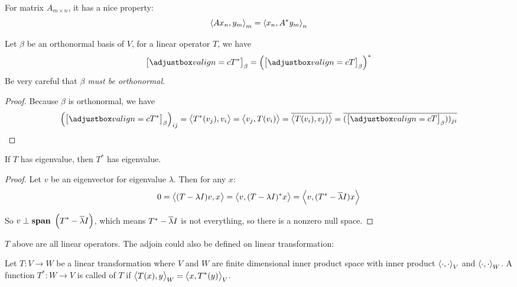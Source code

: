 For matrix $A_{m \times n}$, it has a nice property:
\begin{equation}
    \left\langle \displaystyle A x_n, y_m \right\rangle_m = \left\langle \displaystyle x_n, A^* y_m \right\rangle_n
\end{equation}

\begin{theorem}\label{operator_conjugate_transpose_requirement}
    Let $\beta$ be an orthonormal basis of $V$, for a linear operator $T$, we have
    \begin{equation}
        \coordinate{T^*}_\beta = \left(\coordinate{T}_\beta\right)^*
    \end{equation}
    Be very careful that \emph{$\beta$ must be orthonormal.}
\end{theorem}
\begin{proof}
    Because $\beta$ is orthonormal, we have
    \begin{equation*}
        \left(\coordinate{T^*}_\beta\right)_{ij} = \innerproduct{T^* (v_j)}{v_i} = \innerproduct{v_j}{T(v_i)} = \conjugate{\innerproduct{T(v_i)}{v_j)}} = \conjugate{(\coordinate{T}_\beta))_{ji}}
    \end{equation*}
\end{proof}



\begin{theorem}\label{congjugate_transpose_has_eigenvalue}
    If $T$ has eigenvalue, then $T^*$ has eigenvalue.    
\end{theorem}
\begin{proof}
    Let $v$ be an eigenvector for eigenvalue $\lambda$. Then for any $x$:
    \begin{equation*}
        0 = \left\langle \displaystyle (T-\lambda I)v, x \right\rangle = \left\langle \displaystyle v, (T-\lambda I)^* x \right\rangle = \left\langle \displaystyle v, (T^* - \overline{\lambda}I) x \right\rangle
    \end{equation*}
    
    So $v \perp \displaystyle \mathop{\bf span\/}~\left( T^* - \overline{\lambda}I \right)$, which means $T^* - \overline{\lambda}I$ is not everything, so there is a nonzero null space.
\end{proof}


$T$ above are all linear operators. The adjoin could also be defined on linear transformation:

\begin{definition}
    Let $T : V \rightarrow W$ be a linear transformation where $V$ and $W$ are finite dimensional inner product space with inner product $\left\langle \displaystyle \cdot{}, \cdot{} \right\rangle_V$ and $\left\langle \displaystyle \cdot{}, \cdot{} \right\rangle_W$. A function $T^* : W \rightarrow V$ is called  of $T$ if $\left\langle \displaystyle T(x), y \right\rangle_W = \left\langle \displaystyle x, T^*(y) \right\rangle_V$.
\end{definition}

